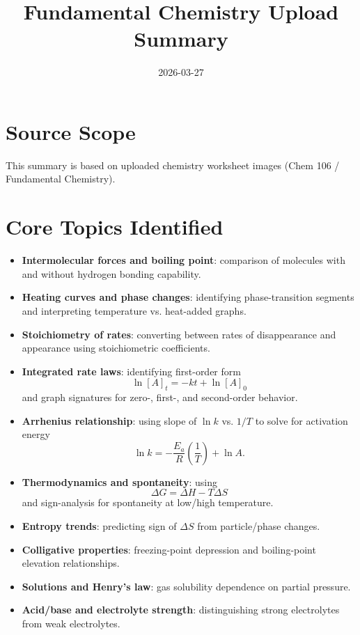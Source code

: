 \documentclass[11pt]{article}
\title{Fundamental Chemistry Upload Summary}
\date{2026-03-27}
\begin{document}
\maketitle

\section*{Source Scope}
This summary is based on uploaded chemistry worksheet images (Chem 106 / Fundamental Chemistry).

\section*{Core Topics Identified}
\begin{itemize}[leftmargin=*]
  \item \textbf{Intermolecular forces and boiling point}: comparison of molecules with and without hydrogen bonding capability.
  \item \textbf{Heating curves and phase changes}: identifying phase-transition segments and interpreting temperature vs. heat-added graphs.
  \item \textbf{Stoichiometry of rates}: converting between rates of disappearance and appearance using stoichiometric coefficients.
  \item \textbf{Integrated rate laws}: identifying first-order form
  \[
    \ln [A]_t = -kt + \ln [A]_0
  \]
  and graph signatures for zero-, first-, and second-order behavior.
  \item \textbf{Arrhenius relationship}: using slope of $\ln k$ vs. $1/T$ to solve for activation energy
  \[
    \ln k = -\frac{E_a}{R}\left(\frac{1}{T}\right) + \ln A.
  \]
  \item \textbf{Thermodynamics and spontaneity}: using
  \[
    \Delta G = \Delta H - T\Delta S
  \]
  and sign-analysis for spontaneity at low/high temperature.
  \item \textbf{Entropy trends}: predicting sign of $\Delta S$ from particle/phase changes.
  \item \textbf{Colligative properties}: freezing-point depression and boiling-point elevation relationships.
  \item \textbf{Solutions and Henry's law}: gas solubility dependence on partial pressure.
  \item \textbf{Acid/base and electrolyte strength}: distinguishing strong electrolytes from weak electrolytes.
\end{itemize}
\end{document}
